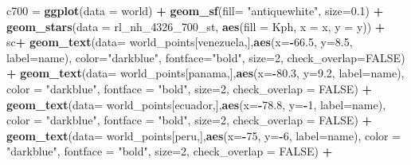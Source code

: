 \documentclass[12pt,oneside]{reedthesis}
\newenvironment{Shaded}{\begin{snugshade}}{\end{snugshade}}
\newcommand{\DataTypeTok}[1]{\textcolor[rgb]{0.13,0.29,0.53}{#1}}
\newcommand{\DecValTok}[1]{\textcolor[rgb]{0.00,0.00,0.81}{#1}}
\newcommand{\FloatTok}[1]{\textcolor[rgb]{0.00,0.00,0.81}{#1}}
\newcommand{\KeywordTok}[1]{\textcolor[rgb]{0.13,0.29,0.53}{\textbf{#1}}}
\newcommand{\NormalTok}[1]{#1}
\newcommand{\OperatorTok}[1]{\textcolor[rgb]{0.81,0.36,0.00}{\textbf{#1}}}
\newcommand{\OtherTok}[1]{\textcolor[rgb]{0.56,0.35,0.01}{#1}}
\newcommand{\StringTok}[1]{\textcolor[rgb]{0.31,0.60,0.02}{#1}}
\begin{document}
\begin{Shaded}
\begin{Highlighting}[]
\NormalTok{c700 =}\StringTok{ }\KeywordTok{ggplot}\NormalTok{(}\DataTypeTok{data =}\NormalTok{ world) }\OperatorTok{+}\StringTok{ }
\StringTok{  }\KeywordTok{geom_sf}\NormalTok{(}\DataTypeTok{fill=} \StringTok{"antiquewhite"}\NormalTok{, }\DataTypeTok{size=}\FloatTok{0.1}\NormalTok{) }\OperatorTok{+}\StringTok{ }
\StringTok{  }\KeywordTok{geom_stars}\NormalTok{(}\DataTypeTok{data =}\NormalTok{ rl_nh_}\DecValTok{4326}\NormalTok{_}\DecValTok{700}\NormalTok{_st, }\KeywordTok{aes}\NormalTok{(}\DataTypeTok{fill =}\NormalTok{ Kph, }\DataTypeTok{x =}\NormalTok{ x, }\DataTypeTok{y =}\NormalTok{ y)) }\OperatorTok{+}\StringTok{ }
\StringTok{  }\NormalTok{sc}\OperatorTok{+}
\StringTok{  }\KeywordTok{geom_text}\NormalTok{(}\DataTypeTok{data=}\NormalTok{ world_points[venezuela,],}\KeywordTok{aes}\NormalTok{(}\DataTypeTok{x=}\OperatorTok{-}\FloatTok{66.5}\NormalTok{, }\DataTypeTok{y=}\FloatTok{8.5}\NormalTok{, }\DataTypeTok{label=}\NormalTok{name), }\DataTypeTok{color=}\StringTok{"darkblue"}\NormalTok{, }\DataTypeTok{fontface=}\StringTok{"bold"}\NormalTok{, }\DataTypeTok{size=}\DecValTok{2}\NormalTok{, }\DataTypeTok{check_overlap=}\OtherTok{FALSE}\NormalTok{) }\OperatorTok{+}
\StringTok{  }\KeywordTok{geom_text}\NormalTok{(}\DataTypeTok{data=}\NormalTok{ world_points[panama,],}\KeywordTok{aes}\NormalTok{(}\DataTypeTok{x=}\OperatorTok{-}\FloatTok{80.3}\NormalTok{, }\DataTypeTok{y=}\FloatTok{9.2}\NormalTok{, }\DataTypeTok{label=}\NormalTok{name), }\DataTypeTok{color =} \StringTok{"darkblue"}\NormalTok{, }\DataTypeTok{fontface =} \StringTok{"bold"}\NormalTok{, }\DataTypeTok{size=}\DecValTok{2}\NormalTok{, }\DataTypeTok{check_overlap =} \OtherTok{FALSE}\NormalTok{) }\OperatorTok{+}\StringTok{ }
\StringTok{  }\KeywordTok{geom_text}\NormalTok{(}\DataTypeTok{data=}\NormalTok{ world_points[ecuador,],}\KeywordTok{aes}\NormalTok{(}\DataTypeTok{x=}\OperatorTok{-}\FloatTok{78.8}\NormalTok{, }\DataTypeTok{y=}\OperatorTok{-}\DecValTok{1}\NormalTok{, }\DataTypeTok{label=}\NormalTok{name), }\DataTypeTok{color =} \StringTok{"darkblue"}\NormalTok{, }\DataTypeTok{fontface =} \StringTok{"bold"}\NormalTok{, }\DataTypeTok{size=}\DecValTok{2}\NormalTok{, }\DataTypeTok{check_overlap =} \OtherTok{FALSE}\NormalTok{) }\OperatorTok{+}
\StringTok{  }\KeywordTok{geom_text}\NormalTok{(}\DataTypeTok{data=}\NormalTok{ world_points[peru,],}\KeywordTok{aes}\NormalTok{(}\DataTypeTok{x=}\OperatorTok{-}\DecValTok{75}\NormalTok{, }\DataTypeTok{y=}\OperatorTok{-}\DecValTok{6}\NormalTok{, }\DataTypeTok{label=}\NormalTok{name), }\DataTypeTok{color =} \StringTok{"darkblue"}\NormalTok{, }\DataTypeTok{fontface =} \StringTok{"bold"}\NormalTok{, }\DataTypeTok{size=}\DecValTok{2}\NormalTok{, }\DataTypeTok{check_overlap =} \OtherTok{FALSE}\NormalTok{) }\OperatorTok{+}

\end{Highlighting}
\end{Shaded}
\end{document}
